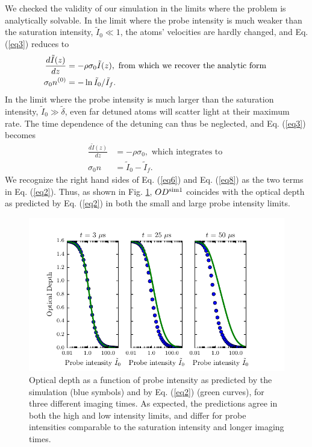 \documentclass[12pt]{iopart}
\begin{document}
\par We checked the validity of our simulation in the limits where the problem is analytically solvable. In the limit where the probe intensity is much weaker than the saturation intensity, $\tilde{I}_0\ll 1$, the atoms' velocities are hardly changed, and Eq.(\ref{eq3}) reduces to
\begin{eqnarray}
\frac{d\tilde{I}(z)}{dz}&=-\rho\sigma_0\tilde{I}(z), \mbox{ from which we recover the analytic form }\\
\sigma_0 n^{\rm{(0)}} &= -\ln\tilde{I}_0/\tilde{I}_f. \label{eq6}
\end{eqnarray}
In the limit where the probe intensity is much larger than the saturation intensity, $\tilde{I}_0\gg \tilde{\delta}$, even far detuned atoms will scatter light at their maximum rate. The time dependence of the detuning can thus be neglected, and Eq. (\ref{eq3}) becomes
\begin{eqnarray}
\frac{d\tilde{I}(z)}{dz}&=-\rho\sigma_0, \mbox{ which integrates to }\\
\sigma_0 n &= \tilde{I}_0 - \tilde{I}_f. \label{eq8}
\end{eqnarray}
We recognize the right hand sides of Eq. (\ref{eq6}) and Eq. (\ref{eq8}) as the two terms in Eq. (\ref{eq2}). Thus, as shown in  Fig. \ref{fig:IsatLimits}, $OD^{\rm{sim1}}$  coincides with the optical depth as predicted by Eq. (\ref{eq2}) in both the small and large probe intensity limits.
\begin{figure}
	\includegraphics{figure3.pdf}
\caption{Optical depth as a function of probe intensity as predicted by the simulation (blue symbols) and by Eq. (\ref{eq2}) (green curves), for three different imaging times. As expected, the predictions agree in both the high and low intensity limits, and differ for probe intensities comparable to the saturation intensity and longer imaging times. }
\label{fig:IsatLimits}
\end{figure}
\end{document}
